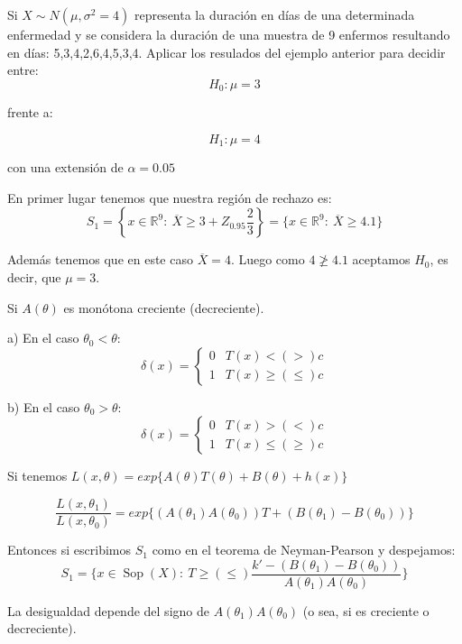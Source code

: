 \documentclass[openany]{book}
\begin{document}
\begin{example}
    Si $ X \sim N (\mu,\sigma^2 = 4)  $ representa la duración en días de una determinada enfermedad y se considera la duración de una muestra de 9 enfermos resultando en días: 5,3,4,2,6,4,5,3,4. Aplicar los resulados del ejemplo anterior para decidir entre:
    $$ H_0: \mu = 3  $$

    frente a:

    $$ H_1: \mu = 4 $$

    con una extensión de $ \alpha = 0.05  $

    En primer lugar tenemos que nuestra región de rechazo es:
    $$ S_1 = \left\{x \in \mathbb{R}^{9}:\ \overline{X}\geq 3+Z_{0.95} \dfrac{2}{3}\right\} = \{x \in \mathbb{R}^{9}:\ \overline{X}\geq 4.1\} $$

    Además tenemos que en este caso $ \overline{X} = 4 $. Luego como $ 4 \not \geq 4.1 $ aceptamos $ H_0 $, es decir, que $ \mu=3 $.
\end{example}

\begin{proposition}
    Si $ A(\theta) $ es monótona creciente (decreciente).

    a) En el caso $ \theta_0<\theta $:
    $$ \delta(x) = \left\{
    \begin{array}{ll}
        0 & T(x) < (>) c \\ 
        1 & T(x) \geq  (\leq ) c
    \end{array}
    \right. $$
    
    b) En el caso $ \theta_0>\theta $:
    $$ \delta(x) = \left\{
    \begin{array}{ll}
        0 & T(x) > (<) c \\ 
        1 & T(x) \leq  (\geq ) c
    \end{array}
    \right. $$

\end{proposition}

\begin{demonstration}
    Si tenemos $ L(x,\theta) = exp \{A(\theta)T(\theta)+B(\theta)+h(x)\} $

    $$ \dfrac{L(x,\theta_1)}{L(x,\theta_0)} = exp \{(A(\theta_1)A(\theta_0))T + (B(\theta_1)-B(\theta_0))\} $$

    Entonces si escribimos $ S_1 $ como en el teorema de Neyman-Pearson y despejamos:
    $$ S_1 = \{x \in \operatorname{Sop}(X):\ T \geq (\leq ) \dfrac{k'-(B(\theta_1)-B(\theta_0))}{A(\theta_1)A(\theta_0)}\} $$

    La desigualdad depende del signo de $ A(\theta_1)A(\theta_0) $ (o sea, si es creciente o decreciente).
\end{demonstration}
\end{document}
